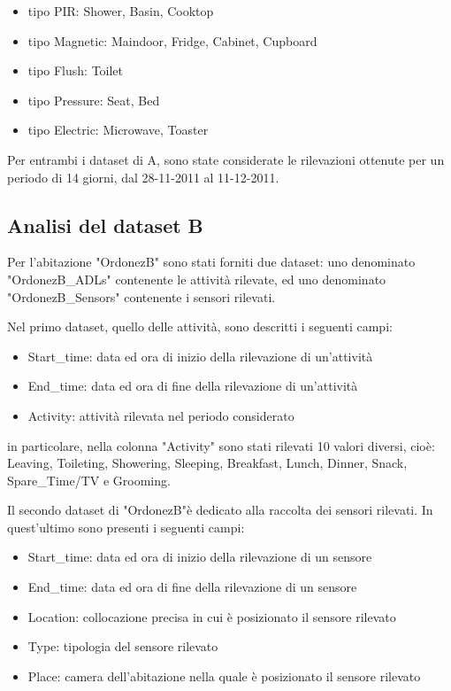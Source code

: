 \documentclass[10pt,a4paper]{article}
\begin{document}
	\begin{itemize}
		\item tipo PIR: Shower, Basin, Cooktop
		\item tipo Magnetic: Maindoor, Fridge, Cabinet, Cupboard
		\item  tipo Flush: Toilet
		\item tipo Pressure: Seat, Bed
		\item tipo Electric: Microwave, Toaster
	\end{itemize}

	Per entrambi i dataset di A, sono state considerate le rilevazioni ottenute per un periodo di 14 giorni, dal 28-11-2011 al 11-12-2011.

	\subsection{Analisi del dataset B}

	Per l'abitazione "OrdonezB" sono stati forniti due dataset: uno denominato "OrdonezB\_ADLs" contenente le attività rilevate, ed uno denominato  "OrdonezB\_Sensors"	 contenente i sensori rilevati.

	Nel primo dataset, quello delle attività, sono descritti i seguenti campi:

	\begin{itemize}
		\item Start\_time: data ed ora di inizio della rilevazione di un'attività
		\item End\_time: data ed ora di fine della rilevazione di un'attività
		\item  Activity: attività rilevata nel periodo considerato
	\end{itemize}

	in particolare, nella colonna "Activity" sono stati rilevati 10 valori diversi, cioè: Leaving, Toileting, Showering, Sleeping, Breakfast, Lunch, Dinner, Snack, Spare\_Time/TV e Grooming.

	Il secondo dataset di "OrdonezB"è dedicato alla raccolta dei sensori rilevati. In quest'ultimo sono presenti i seguenti campi:
	\begin{itemize}
		\item Start\_time: data ed ora di inizio della rilevazione di un sensore
		\item End\_time: data ed ora di fine della rilevazione di un sensore
		\item  Location: collocazione precisa in cui è posizionato il sensore rilevato
		\item Type: tipologia del sensore rilevato
		\item Place: camera dell'abitazione nella quale è posizionato il sensore rilevato
	\end{itemize}
\end{document}
